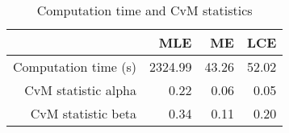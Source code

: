 \begin{table}[ht]
\centering
\begin{tabular}{rrrr}
  \hline
 & MLE & ME & LCE \\ 
  \hline
Computation time (s) & 2324.99 & 43.26 & 52.02 \\ 
  CvM statistic alpha & 0.22 & 0.06 & 0.05 \\ 
  CvM statistic beta & 0.34 & 0.11 & 0.20 \\ 
   \hline
\end{tabular}
\caption{Computation time and CvM statistics} 
\label{tab:beta:time:cvm}
\end{table}
